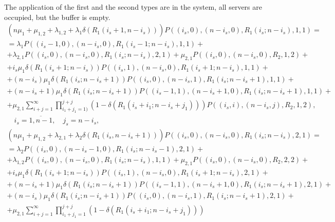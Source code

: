 \documentclass[default]{subfiles}
\begin{document}
{The application of the first and the second types are in the system,
all servers are occupied, but the buffer is empty.
\begin{multline}
  \left(n\mu_1+\mu_{1,2}+\lambda_{1,2}+\lambda_1 \delta\left(R_1
      (i_s+1,n-i_s)\right)\right) P\left((i_s,0),(n-i_s,0),R_1
    (i_s;n-i_s),1,1\right) = \\ = \lambda_1
  P\left((i_s-1,0),(n-i_s,0),R_1 (i_s-1;n-i_s),1,1\right)+\\ +
  \lambda_{2,1} P\left((i_s,0),(n-i_s,0),R_1 (i_s;n-i_s),2,1\right)+
  \mu_{2,1} P\left((i_s,0),(n-i_s,0),R_2,1,2\right)+ \\ +
  i_s\mu_1 \delta\left(R_1 (i_s+1;n-i_s)\right)
  P\left((i_s,1),(n-i_s,0),R_1 (i_s+1;n-i_s),1,1\right)+\\ +
  (n-i_s)\mu_1 \delta\left(R_1 (i_s;n-i_s+1)\right)
  P\left((i_s,0),(n-i_s,1),R_1 (i_s;n-i_s+1),1,1\right)+\\ +
  (n-i_s+1)\mu_1 \delta\left(R_1 (i_s;n-i_s+1)\right)
  P\left((i_s-1,1),(n-i_s+1,0),R_1 (i_s;n-i_s+1),1,1\right)+\\ +
  \mu_{2,1} \sum\limits_{i+j=1}^{\infty}\prod\limits_{i_1+j_1=1)}^{j+j}\left(1-\delta\left(R_1 (i_s+i_1;n-i_s+j_1) \right)\right) P\left((i_s,i),(n-i_s,j),R_2,1,2\right), \\
  \quad i_s=\overline{1,n-1}, \quad j_s=n-i_s,
\label{eq:9.1}
\end{multline}
\begin{multline}
  \left(n\mu_1+\mu_{1,2}+\lambda_{2,1}+\lambda_2 \delta\left(R_1
      (i_s,n-i_s+1)\right)\right) P\left((i_s,0),(n-i_s,0),R_1
    (i_s;n-i_s),2,1\right) = \\ = \lambda_2
  P\left((i_s,0),(n-i_s-1,0),R_1 (i_s;n-i_s-1),2,1\right)+\\ +
  \lambda_{1,2} P\left((i_s,0),(n-i_s,0),R_1 (i_s;n-i_s),1,1\right)+
  \mu_{2,1} P\left((i_s,0),(n-i_s,0),R_2,2,2\right)+ \\ + i_s\mu_1
  \delta\left(R_1 (i_s+1;n-i_s)\right) P\left((i_s,1),(n-i_s,0),R_1
    (i_s+1;n-i_s),2,1\right)+\\ + (n-i_s+1)\mu_1 \delta\left(R_1
    (i_s;n-i_s+1)\right) P\left((i_s-1,1),(n-i_s+1,0),R_1
    (i_s;n-i_s+1),2,1\right)+\\ + (n-i_s)\mu_1 \delta\left(R_1
    (i_s;n-i_s+1)\right) P\left((i_s,0),(n-i_s,1),R_1
    (i_s;n-i_s+1),2,1\right)+\\ + \mu_{2,1}
  \sum\limits_{i+j=1}^{\infty}\prod\limits_{i_1+j_1=1}^{j+j}\left(1-\delta\left(R_1
      (i_s+i_1;n-i_s+j_1) \right)\right)

\end{multline}}
\end{document}

